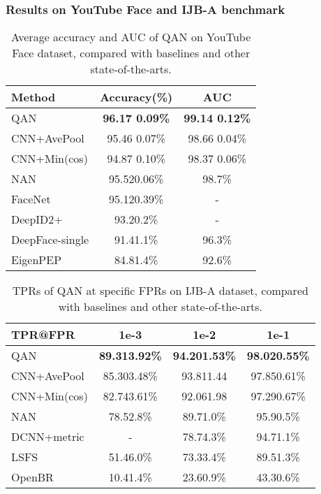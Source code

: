 \documentclass[10pt,twocolumn,letterpaper]{article}
\begin{document}
\subsubsection{Results on YouTube Face and IJB-A benchmark}


\begin{table}[h]
\normalsize
  \centering
  \begin{tabular}{l|c|c}
    \hline
    Method & Accuracy(\%) &AUC \\
    \hline
       QAN   & \bf{96.17 0.09\%} & \bf{99.14 0.12\%} \\
       CNN+AvePool 	 & 95.46 0.07\% & 98.66 0.04\% \\
       CNN+Min(cos)  & 94.87 0.10\% & 98.37 0.06\% \\
    \hline
       NAN\cite{yang2016neural}			 & 95.520.06\% & 98.7\% \\
       FaceNet\cite{schroff2015facenet} 	& 95.120.39\% & - \\
       DeepID2+\cite{sun2015deeply}			& 93.20.2\% & - \\
       DeepFace-single\cite{taigman2014deepface}		& 91.41.1\% & 96.3\% \\
       EigenPEP\cite{li2014eigen}			& 84.81.4\% & 92.6\% \\
    \hline
  \end{tabular}

  \caption{Average accuracy and AUC of QAN on YouTube Face dataset, compared with baselines and other state-of-the-arts.}
  \label{tab:ytf}
\end{table}

\begin{table}[!htbp]
\footnotesize
  \centering
  \begin{tabular}{l|c|c|c}
    \hline
       TPR@FPR & 1e-3 & 1e-2  & 1e-1 \\
    \hline
       QAN 	& \bf{89.313.92\%} & \bf{94.201.53\%} & \bf{98.020.55\%} \\
       CNN+AvePool 		& 85.303.48\% & 93.811.44 & 97.850.61\% \\
       CNN+Min(cos) 	& 82.743.61\% & 92.061.98 & 97.290.67\% \\
    \hline
       NAN\cite{yang2016neural}		&78.52.8\% &89.71.0\% &95.90.5\% \\
       DCNN+metric\cite{chen2015end} 	& - & 78.74.3\% & 94.71.1\% \\
       LSFS\cite{wang2015face}				& 51.46.0\% & 73.33.4\% & 89.51.3\% \\
       OpenBR\cite{klontz2013open}				& 10.41.4\% & 23.60.9\% & 43.30.6\% \\
    \hline
  \end{tabular}
  \caption{TPRs of QAN at specific FPRs on IJB-A dataset, compared with baselines and other state-of-the-arts.}
  \label{tab:ijb}
\end{table}
\end{document}

